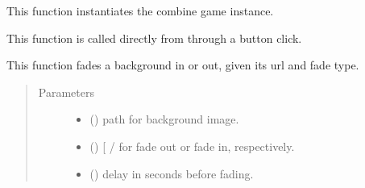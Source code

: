 \documentclass[letterpaper,10pt,english,openany,oneside]{sphinxmanual}
\begin{document}

\begin{fulllineitems}
\label{\detokenize{index:interface.combine_screen}}
This function instantiates the combine game instance.

This function is called directly from  through a button click.

\end{fulllineitems}


\begin{fulllineitems}
\label{\detokenize{index:interface.fade}}
This function fades a background in or out, given its url and fade type.
\begin{quote}\begin{description}
\item[{Parameters}] \leavevmode\begin{itemize}
\item {} 
 () \textendash{} path for background image.

\item {} 
 () \textendash{} {[} /\sphinxcode{\sphinxupquote{"in"}}{]} for fade out or fade in, respectively.

\item {} 
 () \textendash{} delay in seconds before fading.

\end{itemize}

\end{description}\end{quote}

\end{fulllineitems}

\end{document}
